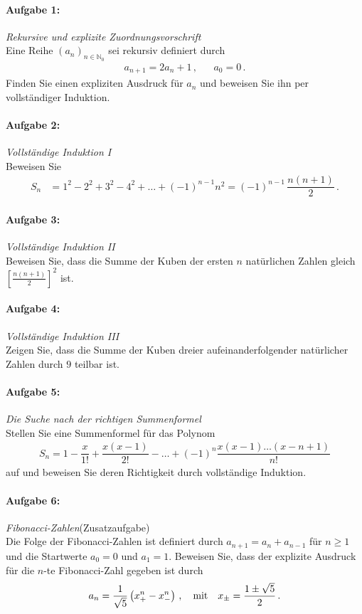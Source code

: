 
\paragraph{Aufgabe 1: } \emph{Rekursive und explizite Zuordnungsvorschrift}\\[0.2cm]
Eine Reihe $(a_n)_{n\in\mathbb{N}_0}$ sei rekursiv definiert durch
\begin{align*}
a_{n+1}=2a_n+1\,, && a_0=0\,.
\end{align*}
Finden Sie einen expliziten Ausdruck für $a_n$ und beweisen Sie ihn per vollständiger Induktion.
%
%
\paragraph{Aufgabe 2: } \emph{Vollständige Induktion I}\\[0.6cm]
Beweisen Sie\\[-1.5cm]
\begin{align*}
S_n&=1^2-2^2+3^2-4^2+\hdots+(-1)^{n-1}n^2=(-1)^{n-1}\,\dfrac{n(n+1)}{2}\,.
\end{align*}
%
\paragraph{Aufgabe 3: } \emph{Vollständige Induktion II}\\[0.2cm]
Beweisen Sie, dass die Summe der Kuben der ersten $n$ natürlichen Zahlen gleich $\left[\frac{n(n+1)}{2}\right]^2$ ist. 
%
\paragraph{Aufgabe 4: } \emph{Vollständige Induktion III}\\[0.2cm]
Zeigen Sie, dass die Summe der Kuben dreier aufeinanderfolgender natürlicher Zahlen durch $9$ teilbar ist.
%
\paragraph{Aufgabe 5: } \emph{Die Suche nach der richtigen Summenformel}\\[0.2cm]
Stellen Sie eine Summenformel für das Polynom
\begin{align*}
S_n = 1-\dfrac{x}{1!}+\dfrac{x(x-1)}{2!}-\hdots+(-1)^n \dfrac{x(x-1)\dots(x-n+1)}{n!}
\end{align*}
auf und beweisen Sie deren Richtigkeit durch vollständige Induktion.
%
\paragraph{Aufgabe 6: } \emph{Fibonacci-Zahlen}\hfill (Zusatzaufgabe)\\[0.2cm]
Die Folge der Fibonacci-Zahlen ist definiert durch $a_{n+1}=a_n+a_{n-1}$ für $n\ge 1$ und die Startwerte $a_0=0$ und $a_1=1$. Beweisen Sie, dass der explizite Ausdruck für die $n$-te Fibonacci-Zahl gegeben ist durch
\begin{align*}
a_n=\frac{1}{\sqrt{5}}\left(x_+^n-x_-^n\right)\,, \qq{mit} x_{\pm}=\frac{1\pm\sqrt{5}}{2}\,.
\end{align*}